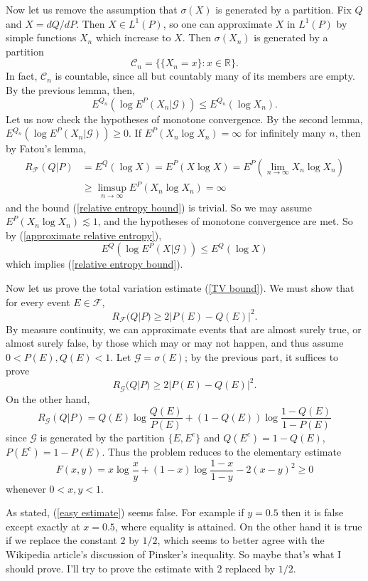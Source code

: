 \documentclass[10pt]{article}
\newcommand{\RR}{\mathbb{R}}
\theoremstyle{definition}
\begin{document}
Now let us remove the assumption that $\sigma(X)$ is generated by a partition.
Fix $Q$ and $X = dQ/dP$. Then $X \in L^1(P)$, so one can approximate $X$ in $L^1(P)$ by simple functions $X_n$ which increase to $X$.
Then $\sigma(X_n)$ is generated by a partition
$$\mathcal C_n = \{\{X_n = x\}: x \in \RR\}.$$
In fact, $\mathcal C_n$ is countable, since all but countably many of its members are empty.
By the previous lemma, then,
\begin{equation}
\label{approximate relative entropy}
E^{Q_n}(\log E^P(X_n|\mathcal G)) \leq E^{Q_n}(\log X_n).
\end{equation}
Let us now check the hypotheses of monotone convergence.
By the second lemma, $E^{Q_n}(\log E^P(X_n|\mathcal G)) \geq 0$.
If $E^P(X_n \log X_n) = \infty$ for infinitely many $n$, then by Fatou's lemma,
\begin{align*}
R_{\mathcal F}(Q|P) &= E^Q(\log X) = E^P(X \log X) = E^P\left(\lim_{n \to \infty} X_n \log X_n\right)\\
&\geq \limsup_{n \to \infty} E^P(X_n \log X_n) = \infty
\end{align*}
and the bound (\ref{relative entropy bound}) is trivial.
So we may assume $E^P(X_n \log X_n) \lesssim 1$, and the hypotheses of monotone convergence are met.
So by (\ref{approximate relative entropy}),
$$E^Q(\log E^P(X|\mathcal G)) \leq E^Q(\log X)$$
which implies (\ref{relative entropy bound}).

Now let us prove the total variation estimate (\ref{TV bound}).
We must show that for every event $E \in \mathcal F$,
$$R_{\mathcal F}(Q|P) \geq 2|P(E) - Q(E)|^2.$$
By measure continuity, we can approximate events that are almost surely true, or almost surely false, by those which may or may not happen, and thus assume $0 < P(E), Q(E) < 1$.
Let $\mathcal G = \sigma(E)$; by the previous part, it suffices to prove
$$R_{\mathcal G}(Q|P) \geq 2|P(E) - Q(E)|^2.$$
On the other hand,
$$R_{\mathcal G}(Q|P) = Q(E) \log \frac{Q(E)}{P(E)} + (1 - Q(E)) \log \frac{1 - Q(E)}{1 - P(E)}$$
since $\mathcal G$ is generated by the partition $\{E, E^c\}$ and $Q(E^c) = 1 - Q(E)$, $P(E^c) = 1 - P(E)$.
Thus the problem reduces to the elementary estimate
\begin{equation}
\label{easy estimate}
F(x, y) = x \log \frac{x}{y} + (1 - x) \log\frac{1 - x}{1 - y} - 2(x - y)^2 \geq 0
\end{equation}
whenever $0 < x, y < 1$.

As stated, (\ref{easy estimate}) seems false. For example if $y = 0.5$ then it is false except exactly at $x = 0.5$, where equality is attained.
On the other hand it is true if we replace the constant $2$ by $1/2$, which seems to better agree with the Wikipedia article's discussion of Pinsker's inequality.
So maybe that's what I should prove. I'll try to prove the estimate with $2$ replaced by $1/2$.
\end{document}
